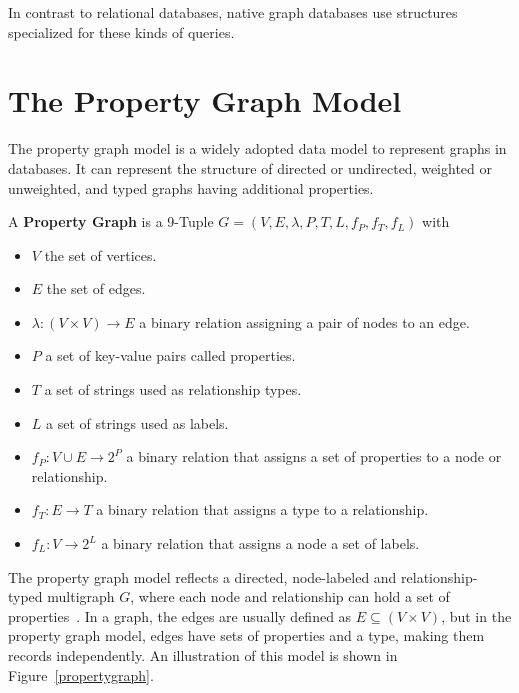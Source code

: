         In contrast to relational databases, native graph databases use structures specialized for these kinds of queries.
            
    \section{The Property Graph Model}\label{prop-graph-model}
        The property graph model is a widely adopted data model to represent graphs in databases.
        It can represent the structure of directed or undirected, weighted or unweighted, and typed graphs having additional properties.

        A \textbf{Property Graph} is a 9-Tuple $G = (V, E, \lambda, P, T, L, f_P, f_T, f_L)$ with 
        \begin{itemize}
            \item $V$ the set of vertices.
            \item $E$ the set of edges.
            \item $\lambda: (V \times V) \rightarrow E$ a binary relation assigning a pair of nodes to an edge.
            \item $P$ a set of key-value pairs called properties.
            \item $T$ a set of strings used as relationship types.
            \item $L$ a set of strings used as labels.
            \item $f_P: V \cup E \rightarrow 2^P$ a binary relation that assigns a set of properties to a node or relationship.
            \item $f_T: E \rightarrow T$ a binary relation that assigns a type to a relationship.
            \item  $f_L: V \rightarrow 2^L$ a binary relation that assigns a node a set of labels.
        \end{itemize} 
        \smallskip
        The property graph model reflects a directed, node-labeled and relationship-typed multigraph $G$, where each node and relationship can hold a set of properties~\cite{angles2018property, rodriguez2012graph, Rodriguez2010ConstructionsFD}.
        In a graph, the edges are usually defined as $E \subseteq (V \times V)$, but in the property graph model, edges have sets of properties and a type, making them records independently. 
        An illustration of this model is shown in Figure~\ref{propertygraph}.
        
